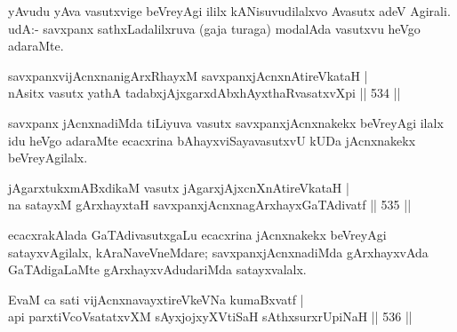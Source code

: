\begin{artha}
yAvudu  yAva vasutxvige beVreyAgi ililx kANisuvudilalxvo Avasutx adeV Agirali. udA:- savxpanx sathxLadalilxruva (gaja turaga) modalAda vasutxvu heVgo adaraMte.
\end{artha}


\begin{shl}
savxpanxvijAcnxnanigArxRhayxM savxpanxjAcnxnAtireVkataH | \\
nAsitx vasutx yathA tadabxjAjxgarxdAbxhAyxthaRvasatxvXpi \hfill||  534 || 
\end{shl}

\begin{artha}
savxpanx jAcnxnadiMda tiLiyuva vasutx savxpanxjAcnxnakekx beVreyAgi ilalx idu heVgo adaraMte ecacxrina bAhayxviSayavasutxvU kUDa jAcnxnakekx beVreyAgilalx.
\end{artha}


\begin{shl}
\footnotemark[2]jAgarxtukxmABxdikaM vasutx jAgarxjAjxcnXnAtireVkataH | \\
na satayxM gArxhayxtaH savxpanxjAcnxnagArxhayxGaTAdivatf \hfill||  535 ||  
\end{shl}

\begin{artha}
ecacxrakAlada GaTAdivasutxgaLu ecacxrina jAcnxnakekx beVreyAgi satayxvAgilalx, kAraNaveVneMdare; savxpanxjAcnxnadiMda gArxhayxvAda GaTAdigaLaMte gArxhayxvAdudariMda satayxvalalx.
\end{artha}

\begin{shl}
EvaM ca sati vijAcnxnavayxtireVkeVNa kumaBxvatf | \\
api parxtiVcoV\s satatxvXM sAyxjojxyXVtiSaH \footnotemark[1]sAthxsurxrUpiNaH \hfill||  536 ||  
\end{shl}

